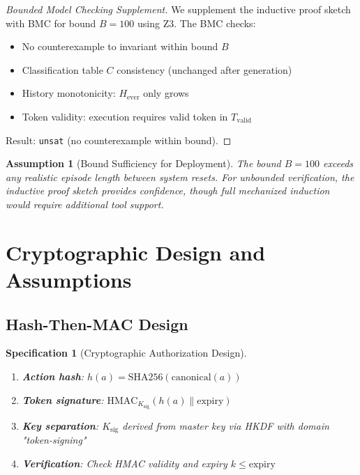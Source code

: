 \documentclass[12pt]{article}
\newtheorem{spec}{Specification}[section]
\newtheorem{assumption}{Assumption}[section]
\begin{document}
\begin{proof}[Bounded Model Checking Supplement]
We supplement the inductive proof sketch with BMC for bound $B=100$ using Z3. The BMC checks:
\begin{itemize}
    \item No counterexample to invariant within bound $B$
    \item Classification table $C$ consistency (unchanged after generation)
    \item History monotonicity: $H_{\text{ever}}$ only grows
    \item Token validity: execution requires valid token in $T_{\text{valid}}$
\end{itemize}
Result: \texttt{unsat} (no counterexample within bound).
\end{proof}

\begin{assumption}[Bound Sufficiency for Deployment]
The bound $B=100$ exceeds any realistic episode length between system resets. For unbounded verification, the inductive proof sketch provides confidence, though full mechanized induction would require additional tool support.
\end{assumption}

\section{Cryptographic Design and Assumptions}

\subsection{Hash-Then-MAC Design}

\begin{spec}[Cryptographic Authorization Design]
\begin{enumerate}
    \item \textbf{Action hash}: $h(a) = \mathrm{SHA256}(\mathrm{canonical}(a))$
    \item \textbf{Token signature}: $\mathrm{HMAC}_{K_{\text{sig}}}(h(a) \| \text{expiry})$
    \item \textbf{Key separation}: $K_{\text{sig}}$ derived from master key via HKDF with domain "token-signing"
    \item \textbf{Verification}: Check HMAC validity and expiry $k \leq \text{expiry}$
\end{enumerate}
\end{spec}
\end{document}
